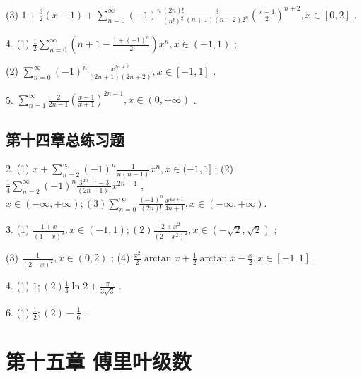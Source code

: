 (3) \(1 + \frac{3}{2}\left( {x - 1}\right)  + \mathop{\sum }\limits_{{n = 0}}^{\infty }{\left( -1\right) }^{n}\frac{\left( {2n}\right) !}{{\left( n!\right) }^{2}}\frac{3}{\left( {n + 1}\right) \left( {n + 2}\right) {2}^{n}}{\left( \frac{x - 1}{2}\right) }^{n + 2},x \in  \left\lbrack  {0,2}\right\rbrack\) .

4. (1) \(\frac{1}{2}\mathop{\sum }\limits_{{n = 0}}^{\infty }\left( {n + 1 - \frac{1 + {\left( -1\right) }^{n}}{2}}\right) {x}^{n},x \in  \left( {-1,1}\right)\) ;

(2) \(\mathop{\sum }\limits_{{n = 0}}^{\infty }{\left( -1\right) }^{n}\frac{{x}^{{2n} + 2}}{\left( {{2n} + 1}\right) \left( {{2n} + 2}\right) },x \in  \left\lbrack  {-1,1}\right\rbrack\) .

5. \(\mathop{\sum }\limits_{{n = 1}}^{\infty }\frac{2}{{2n} - 1}{\left( \frac{x - 1}{x + 1}\right) }^{{2n} - 1},x \in  \left( {0, + \infty }\right)\) .

\subsection{第十四章总练习题}

2. (1) \(x + \mathop{\sum }\limits_{{n = 2}}^{\infty }{\left( -1\right) }^{n}\frac{1}{n\left( {n - 1}\right) }{x}^{n},x \in  ( - 1,1\rbrack\) ; (2) \(\frac{1}{4}\mathop{\sum }\limits_{{n = 2}}^{\infty }{\left( -1\right) }^{n}\frac{{3}^{{2n} - 1} - 3}{\left( {{2n} - 1}\right) !}{x}^{{2n} - 1}\) , \(x \in  \left( {-\infty , + \infty }\right) ;\left( 3\right) \mathop{\sum }\limits_{{n = 0}}^{\infty }\frac{{\left( -1\right) }^{n}}{\left( {2n}\right) !}\frac{{x}^{{4n} + 1}}{{4n} + 1},x \in  \left( {-\infty , + \infty }\right) .\)

3. (1) \(\frac{1 + x}{{\left( 1 - x\right) }^{3}},x \in  \left( {-1,1}\right) ;\left( 2\right) \frac{2 + {x}^{2}}{{\left( 2 - {x}^{2}\right) }^{2}},x \in  \left( {-\sqrt{2},\sqrt{2}}\right)\) ;

(3) \(\frac{1}{{\left( 2 - x\right) }^{2}},x \in  \left( {0,2}\right)\) ; (4) \(\frac{{x}^{2}}{2}\arctan x + \frac{1}{2}\arctan x - \frac{x}{2},x \in  \left\lbrack  {-1,1}\right\rbrack\) .

4. (1) \(1;\left( 2\right) \frac{1}{3}\ln 2 + \frac{\pi }{3\sqrt{3}}\) .

6. (1) \(\frac{1}{2};\left( 2\right)  - \frac{1}{6}\) .

\section{第十五章 傅里叶级数}


